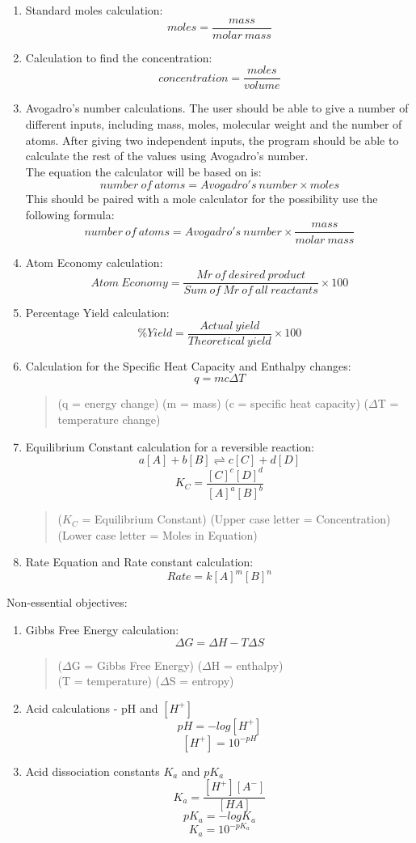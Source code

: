 \documentclass[a4paper,12pt]{article}
\begin{document}
\begin{enumerate}

\item Standard moles calculation:
\[moles=\frac{mass}{molar\: mass}\]
\item Calculation to find the concentration:
\[concentration=\frac{moles}{volume}\]
\newpage
\item Avogadro's number calculations. The user should be able to give a number of different inputs, including mass, moles, molecular weight and the number of atoms. After giving two independent inputs, the program should be able to calculate the rest of the values using Avogadro's number.\\
The equation the calculator will be based on is:
\[number\: of\: atoms = Avogadro's\: number \times moles\]
This should be paired with a mole calculator for the possibility use the following formula:
\[number\: of\: atoms = Avogadro's\: number \times \frac{mass}{molar\: mass}\]
\item Atom Economy calculation:
\[Atom\: Economy = \frac{Mr\: of\: desired\: product}{Sum\: of\: Mr\: of\: all\: reactants}\times 100\]
\item Percentage Yield calculation:
\[\%Yield = \frac{Actual\: yield}{Theoretical\: yield} \times 100\]
\item Calculation for the Specific Heat Capacity and Enthalpy changes:
\[q = mc {\Delta} T\]
\begin{quote}
(q = energy change) (m = mass) (c = specific heat capacity) (${\Delta}$T = temperature change)
\end{quote}
\item Equilibrium Constant calculation for a reversible reaction:
\[a[A] + b[B] \rightleftharpoons c[C] + d[D]\]
\[K_{C} = \frac{[C]^{c}[D]^{d}}{[A]^{a}[B]^{b}}\]
\begin{quote}
($K_{C}$ = Equilibrium Constant) (Upper case letter = Concentration) (Lower case letter = Moles in Equation)
\end{quote}
\item Rate Equation and Rate constant calculation:
\[Rate = k[A]^{m}[B]^{n}\]

\end{enumerate}

Non-essential objectives:
\begin{enumerate}
\item Gibbs Free Energy calculation:
\[{\Delta}G = {\Delta}H - T{\Delta}S\]
\begin{quote}
(${\Delta}$G = Gibbs Free Energy) (${\Delta}$H = enthalpy)\\
(T = temperature) (${\Delta}$S = entropy)
\end{quote}
\item Acid calculations - pH and $[H^{+}]$
\[pH = -log[H^{+}]\]
\[[H^{+}] = 10^{-pH}\]
\item Acid dissociation constants $K_{a}$ and $pK_{a}$
\[K_{a} = \frac{[H^{+}][A^{-}]}{[HA]}\]
\[pK_{a} = -logK_{a}\]
\[K_{a} = 10^{-pK_{a}}\]
\end{enumerate}
\end{document}
